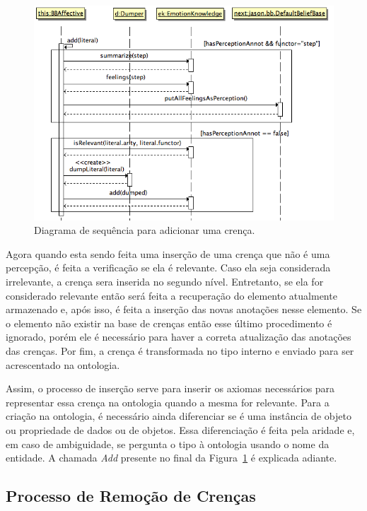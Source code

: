 \begin{figure}
  \centering
  \includegraphics[width=12cm]{figuras/addB.png}
  \caption{Diagrama de sequência para adicionar uma crença.}
  \label{fig:addBelief}
\end{figure}

Agora quando esta sendo feita uma inserção de uma crença que não é uma
percepção, é feita a verificação se ela é relevante. Caso ela seja considerada
irrelevante, a crença sera inserida no segundo nível. Entretanto, se ela for
considerado relevante então será feita a recuperação do elemento atualmente
armazenado e, após isso, é feita a inserção das novas anotações nesse
elemento. Se o elemento não existir na base de crenças então esse último
procedimento é ignorado, porém ele é necessário para haver a correta
atualização das anotações das crenças. Por fim, a crença é transformada no
tipo interno e enviado para ser acrescentado na ontologia.

Assim, o processo de inserção serve para inserir os axiomas necessários para
representar essa crença na ontologia quando a mesma for relevante. Para a
criação na ontologia, é necessário ainda diferenciar se é uma instância de
objeto ou propriedade de dados ou de objetos. Essa diferenciação é feita pela
aridade e, em caso de ambiguidade, se pergunta o tipo à ontologia usando o
nome da entidade. A chamada \emph{Add} presente no final da
Figura~\ref{fig:addBelief} é explicada adiante.

\vfill

\subsection{Processo de Remoção de Crenças}


